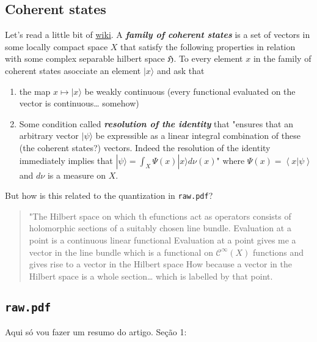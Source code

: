 \subsection{Coherent states}

Let's read a little bit of \href{https://en.wikipedia.org/wiki/Coherent_states_in_mathematical_physics}{wiki}. A \textit{\textbf{family of coherent states}} is a set of vectors in some locally compact space  $X$ that satisfy the following properties in relation with some complex separable hilbert space $\mathfrak{H}$. To every element $x$ in the family of coherent states asocciate an element $|x\rangle$ and ask that
\begin{enumerate}
	\item the map $x\mapsto |x\rangle$ be weakly continuous (every functional evaluated on the vector is continuous… somehow)

	\item Some condition called \textit{\textbf{resolution of the identity}} that "ensures that an arbitrary vector  $|\psi\rangle$ be expressible as a linear integral combination of these (the coherent states?) vectors. Indeed the resolution of the identity immediately implies that $|\psi\rangle=\int_{X}\Psi(x)|x\rangle d\nu(x)$" where $\Psi(x)=\left<x|\psi\right> $ and $d\nu$ is a measure on $X$.
\end{enumerate}

{\color{4}But how is this related to the quantization in \texttt{raw.pdf}}?

{\color{1}\begin{quotation}
		"The Hilbert space on which th efunctions act as operators consists of holomorphic sections of a suitably chosen line bundle. Evaluation at a point is a continuous linear functional {\color{3}Evaluation at a point gives me a vector in the line bundle which is a functional on $\mathcal{C}^\infty(X)$ functions} and gives rise to a vector in the Hilbert space {\color{3}How because a vector in the Hilbert space is a whole section…} which is labelled by that point.
\end{quotation}}

\subsection{\texttt{raw.pdf}}

Aqui só vou fazer um resumo do artigo. Seção 1:

